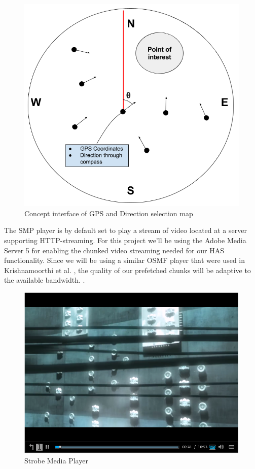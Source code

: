 \documentclass[9pt,a4paper]{acmproc}
\begin{document}
\begin{figure}[t!]
\begin{center}
	\includegraphics[scale=0.5]{teomet.png}
	\caption{Concept interface of GPS and Direction selection map}
	\label{fig:gpsinterface}
\end{center}
\end{figure}


The SMP player is by default set to play a stream of video located at a server supporting HTTP-streaming. For this project we'll be using the Adobe Media Server 5 for enabling the chunked video streaming needed for our HAS functionality. Since we will be using a similar OSMF player that were used in Krishnamoorthi et al. \cite{hasmultipath}, the quality of our prefetched chunks will be adaptive to the available bandwidth. \cite{hasmultipath}.

\begin{figure}[t!]
\begin{center}
	\includegraphics[scale=0.5]{Media_player.png}
	\caption{Strobe Media Player}
	\label{fig:mediaplayer}
\end{center}
\end{figure}
\end{document}
